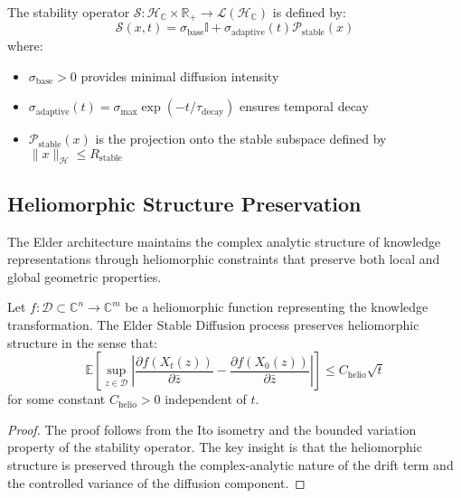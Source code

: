 \begin{definition}
The stability operator $\mathcal{S}: \mathcal{H}_{\mathbb{C}} \times \mathbb{R}_+ \to \mathcal{L}(\mathcal{H}_{\mathbb{C}})$ is defined by:
\begin{equation}
\mathcal{S}(x, t) = \sigma_{\text{base}} \mathbb{I} + \sigma_{\text{adaptive}}(t) \mathcal{P}_{\text{stable}}(x)
\end{equation}
where:
\begin{itemize}
\item $\sigma_{\text{base}} > 0$ provides minimal diffusion intensity
\item $\sigma_{\text{adaptive}}(t) = \sigma_{\max} \exp(-t/\tau_{\text{decay}})$ ensures temporal decay
\item $\mathcal{P}_{\text{stable}}(x)$ is the projection onto the stable subspace defined by $\|x\|_{\mathcal{H}} \leq R_{\text{stable}}$
\end{itemize}
\end{definition}

\subsection{Heliomorphic Structure Preservation}

The Elder architecture maintains the complex analytic structure of knowledge representations through heliomorphic constraints that preserve both local and global geometric properties.

\begin{theorem}
Let $f: \mathcal{D} \subset \mathbb{C}^n \to \mathbb{C}^m$ be a heliomorphic function representing the knowledge transformation. The Elder Stable Diffusion process preserves heliomorphic structure in the sense that:
\begin{equation}
\mathbb{E}\left[\sup_{z \in \mathcal{D}} \left|\frac{\partial f(X_t(z))}{\partial \bar{z}} - \frac{\partial f(X_0(z))}{\partial \bar{z}}\right|\right] \leq C_{\text{helio}} \sqrt{t}
\end{equation}
for some constant $C_{\text{helio}} > 0$ independent of $t$.
\end{theorem}

\begin{proof}
The proof follows from the Ito isometry and the bounded variation property of the stability operator. The key insight is that the heliomorphic structure is preserved through the complex-analytic nature of the drift term and the controlled variance of the diffusion component.
\end{proof}

